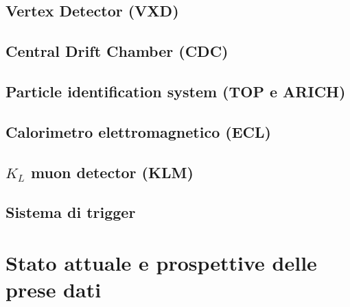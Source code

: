 \documentclass[10pt,a4paper,twoside]{report}
\begin{document}
\begin{comment}
Il rivelatore Belle II è uno spettrometro di particelle general-purpose, ottimizzato nelle misure di precisione dei mesoni B e dei loro prodotti di decadimento. Rispetto al suo predecessore Belle, deve riuscire a mantenere buone performance, pur avendo un minore boost nel centro di masse e nonostante sia sottoposto a maggiori livelli di background e quindi di radiazione, che sono la principale causa di una prematura degradazione delle prestazioni e della vita media del rivelatore stesso.

Belle II consiste in una serie di sottorivelatori annidiati, che circondano il PI dei due fasci, posti intorno alla beam pipe di berillio di 1cm di raggio.

\end{comment}

\subsection{Vertex Detector (VXD)}

\subsection{Central Drift Chamber (CDC)}

\subsection{Particle identification system (TOP e ARICH)}

\subsection{Calorimetro elettromagnetico (ECL)}

\subsection{$K_{L}$ muon detector (KLM)}

\subsection{Sistema di trigger}


\section{Stato attuale e prospettive delle prese dati}
\end{document}
